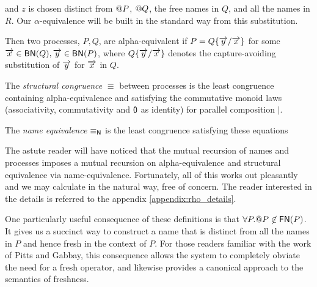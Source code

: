 and $z$ is chosen distinct from $\mathsf{@} P$, $\mathsf{@} Q$, the free
names in $Q$, and all the names in $R$. Our $\alpha$-equivalence will
be built in the standard way from this substitution.

\begin{definition}
Then two processes, $P,Q$, are alpha-equivalent if $P = Q\{\overrightarrow{y}/\overrightarrow{x}\}$ for
some $\overrightarrow{x} \in \mathsf{BN}(Q),\overrightarrow{y} \in \mathsf{BN}(P)$, where $Q\{\overrightarrow{y}/\overrightarrow{x}\}$
denotes the capture-avoiding substitution of $\overrightarrow{y}$ for $\overrightarrow{x}$ in $Q$.
\end{definition}

\begin{definition}
  The {\em structural congruence} $\equiv$
  between processes \cite{DBLP:books/daglib/0004377} is the least congruence containing
  alpha-equivalence and satisfying the commutative monoid laws
  (associativity, commutativity and $\mathsf{0}$ as identity) for parallel
  composition $|$.
\end{definition}

\begin{definition}
  The {\em name equivalence} $\mathsf{\equiv_N}$ is the least congruence
  satisfying these equations
\end{definition}

The astute reader will have noticed that the mutual recursion of names
and processes imposes a mutual recursion on alpha-equivalence and
structural equivalence via name-equivalence. Fortunately, all of this
works out pleasantly and we may calculate in the natural way, free of
concern. The reader interested in the details is referred to the
appendix \ref{appendix:rho_details}.

\begin{remark}\label{rem:no_self_referential_names}
  One particularly useful consequence of these definitions is that
  $\forall P. \mathsf{@} P \not\in \mathsf{FN}(P)$. It gives us a
  succinct way to construct a name that is distinct from all the names
  in $P$ and hence fresh in the context of $P$. For those readers
  familiar with the work of Pitts and Gabbay, this consequence allows
  the system to completely obviate the need for a fresh operator, and
  likewise provides a canonical approach to the semantics of
  freshness.
\end{remark}

